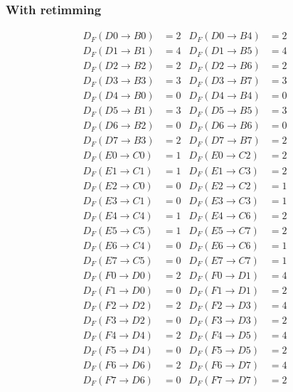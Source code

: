 \documentclass[journal,comsoc]{IEEEtran}
\begin{document}
\subsubsection{With retimming\label{sec:appen:folding_eq_ret}}
\begin{small}
\begin{align*}
D_F(D0\to B0)&=2 &  D_F(D0\to B4)&=2\\
D_F(D1\to B1)&=4 &  D_F(D1\to B5)&=4\\
D_F(D2\to B2)&=2 &  D_F(D2\to B6)&=2\\
D_F(D3\to B3)&=3 &  D_F(D3\to B7)&=3\\
D_F(D4\to B0)&=0 &  D_F(D4\to B4)&=0\\
D_F(D5\to B1)&=3 &  D_F(D5\to B5)&=3\\
D_F(D6\to B2)&=0 &  D_F(D6\to B6)&=0\\
D_F(D7\to B3)&=2 &  D_F(D7\to B7)&=2\\
D_F(E0\to C0)&=1 &  D_F(E0\to C2)&=2\\
D_F(E1\to C1)&=1 &  D_F(E1\to C3)&=2\\
D_F(E2\to C0)&=0 &  D_F(E2\to C2)&=1\\
D_F(E3\to C1)&=0 &  D_F(E3\to C3)&=1\\
D_F(E4\to C4)&=1 &  D_F(E4\to C6)&=2\\
D_F(E5\to C5)&=1 &  D_F(E5\to C7)&=2\\
D_F(E6\to C4)&=0 &  D_F(E6\to C6)&=1\\
D_F(E7\to C5)&=0 &  D_F(E7\to C7)&=1\\
D_F(F0\to D0)&=2 &  D_F(F0\to D1)&=4\\
D_F(F1\to D0)&=0 &  D_F(F1\to D1)&=2\\
D_F(F2\to D2)&=2 &  D_F(F2\to D3)&=4\\
D_F(F3\to D2)&=0 &  D_F(F3\to D3)&=2\\
D_F(F4\to D4)&=2 &  D_F(F4\to D5)&=4\\
D_F(F5\to D4)&=0 &  D_F(F5\to D5)&=2\\
D_F(F6\to D6)&=2 &  D_F(F6\to D7)&=4\\
D_F(F7\to D6)&=0 &  D_F(F7\to D7)&=2\\
\end{align*}
\end{small}

\end{document}
